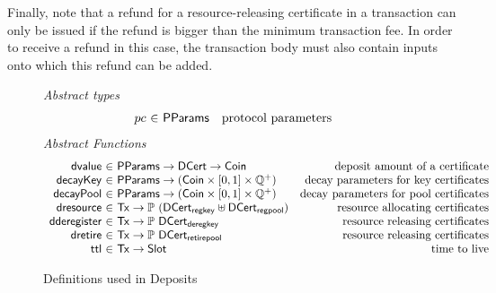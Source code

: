 \documentclass[11pt,a4paper,dvipsnames]{article}
\newcommand{\Tx}{\type{Tx}}
\newcommand{\Coin}{\type{Coin}}
\newcommand{\PParams}{\type{PParams}}
\newcommand{\Slot}{\type{Slot}}
\newcommand{\DCert}{\type{DCert}}
\newcommand{\DCertRegKey}{\type{DCert_{regkey}}}
\newcommand{\DCertDeRegKey}{\type{DCert_{deregkey}}}
\newcommand{\DCertRegPool}{\type{DCert_{regpool}}}
\newcommand{\DCertRetirePool}{\type{DCert_{retirepool}}}
\theoremstyle{definition}
\theoremstyle{definition}
\begin{document}
Finally, note that a refund for a resource-releasing certificate in a
transaction can only be issued if the refund is bigger than the minimum
transaction fee. In order to receive a refund in this case, the transaction
body must also contain inputs onto which this refund can be added.


\begin{figure*}
  \emph{Abstract types}
  \begin{equation*}
    \begin{array}{r@{~\in~}lr}
      pc & \PParams & \text{protocol parameters}
    \end{array}
  \end{equation*}
  \emph{Abstract Functions}
  \begin{equation*}
    \begin{array}{r@{~\in~}lr}
      \fun{dvalue} & \PParams \to \DCert \to \Coin
        & \text{deposit amount of a certificate}\\

      \fun{decayKey} & \PParams \to
      (\Coin\times\lbrack 0, 1\rbrack\times\mathbb{Q}^{+})
        & \text{decay parameters for key certificates}\\
      \fun{decayPool} & \PParams \to
      (\Coin\times\lbrack 0, 1\rbrack\times\mathbb{Q}^{+})
        & \text{decay parameters for pool certificates}\\

      \fun{dresource} & \Tx \to \powerset{(\DCertRegKey \uniondistinct \DCertRegPool)}
        & \text{resource allocating certificates}\\

      \fun{dderegister} & \Tx \to \powerset{\DCertDeRegKey}
        & \text{resource releasing certificates}\\

      \fun{dretire} & \Tx \to \powerset{\DCertRetirePool}
        & \text{resource releasing certificates}\\

      \fun{ttl} & \Tx \to \Slot
        & \text{time to live}\\
    \end{array}
  \end{equation*}
  \caption{Definitions used in Deposits}
  \label{fig:defs:deposits}
\end{figure*}
\end{document}
